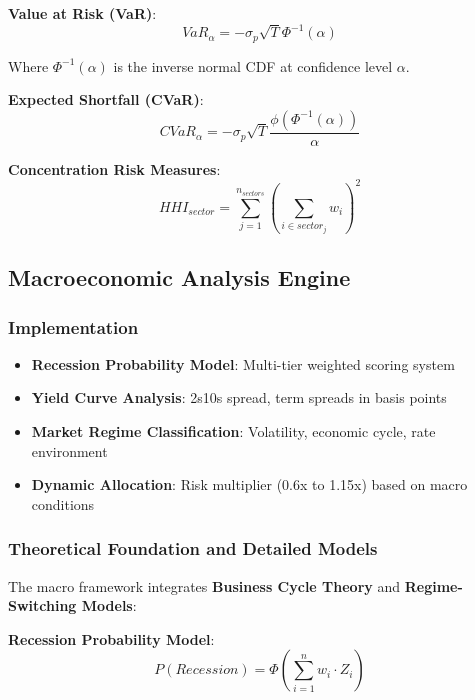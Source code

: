 \documentclass[12pt,a4paper]{article}
\begin{document}
\textbf{Value at Risk (VaR)}:
\begin{equation}
VaR_\alpha = -\sigma_p \sqrt{T} \Phi^{-1}(\alpha)
\end{equation}

Where $\Phi^{-1}(\alpha)$ is the inverse normal CDF at confidence level $\alpha$.

\textbf{Expected Shortfall (CVaR)}:
\begin{equation}
CVaR_\alpha = -\sigma_p \sqrt{T} \frac{\phi(\Phi^{-1}(\alpha))}{\alpha}
\end{equation}

\textbf{Concentration Risk Measures}:
\begin{equation}
HHI_{sector} = \sum_{j=1}^{n_{sectors}} \left(\sum_{i \in sector_j} w_i\right)^2
\end{equation}

\subsection{Macroeconomic Analysis Engine}

\subsubsection{Implementation}
\begin{itemize}
    \item \textbf{Recession Probability Model}: Multi-tier weighted scoring system
    \item \textbf{Yield Curve Analysis}: 2s10s spread, term spreads in basis points
    \item \textbf{Market Regime Classification}: Volatility, economic cycle, rate environment
    \item \textbf{Dynamic Allocation}: Risk multiplier (0.6x to 1.15x) based on macro conditions
\end{itemize}

\subsubsection{Theoretical Foundation and Detailed Models}
The macro framework integrates \textbf{Business Cycle Theory} and \textbf{Regime-Switching Models}:

\textbf{Recession Probability Model}:
\begin{equation}
P(Recession) = \Phi\left(\sum_{i=1}^n w_i \cdot Z_i\right)
\end{equation}
\end{document}
